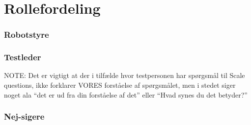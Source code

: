 \section{Rollefordeling}
\label{TestAfSkalaRollefordeling}
%
\subsubsection*{Robotstyre}

\subsubsection*{Testleder}

NOTE: Det er vigtigt at der i tilfælde hvor testpersonen har spørgsmål til Scale questions, ikke forklarer VORES forståelse af spørgsmålet, men i stedet siger noget ala “det er ud fra din forståelse af det” eller “Hvad synes du det betyder?” 

\subsubsection*{Nej-sigere}